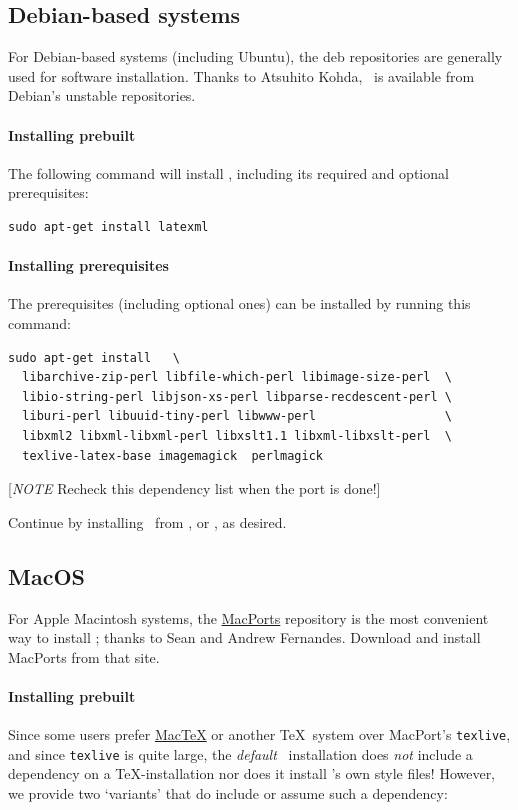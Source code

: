 \documentclass{article}
\begin{document}
\subsection{Debian-based systems}\label{install.deb}
For Debian-based systems (including Ubuntu), the deb repositories
are generally used for software installation.
Thanks to Atsuhito Kohda, \LaTeXML\ is available from Debian's
unstable repositories.

\paragraph{Installing prebuilt}
The following command will install \LaTeXML, including its required
and optional prerequisites:
\begin{lstlisting}[style=shell]
sudo apt-get install latexml
\end{lstlisting}

\paragraph{Installing prerequisites}\label{install.deb.prereq}
The prerequisites (including optional ones) can be installed
by running this command: 
\begin{lstlisting}[style=shell]
sudo apt-get install   \
  libarchive-zip-perl libfile-which-perl libimage-size-perl  \
  libio-string-perl libjson-xs-perl libparse-recdescent-perl \
  liburi-perl libuuid-tiny-perl libwww-perl                  \
  libxml2 libxml-libxml-perl libxslt1.1 libxml-libxslt-perl  \
  texlive-latex-base imagemagick  perlmagick
\end{lstlisting}
[\emph{NOTE} Recheck this dependency list when the port is done!]

Continue by installing \LaTeXML\ from
\htmlref{tarball}{install.tarball}, 
or , as desired.

\subsection{MacOS}\label{install.mac}
For Apple Macintosh systems, the  \href{http://www.macports.org}{MacPorts}
repository is the most convenient way to install \LaTeXML; thanks to Sean and Andrew Fernandes.
Download and install MacPorts from that site.

\paragraph{Installing prebuilt}
Since some users prefer \href{http://tug.org/mactex/}{MacTeX} or another
\TeX\ system over MacPort's \texttt{texlive}, and since \texttt{texlive} is quite large,
the \emph{default} \LaTeXML\ installation does \emph{not} include a dependency
on a \TeX-installation nor does it install \LaTeXML's own style files!
However, we provide two `variants' that do include or assume such a dependency:
\end{document}
